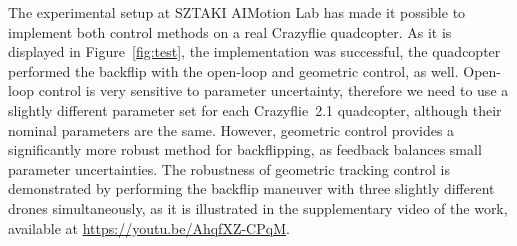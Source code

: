 The experimental setup at SZTAKI AIMotion Lab has made it possible to implement both control methods on a real Crazyflie quadcopter. As it is displayed in Figure~\ref{fig:test}, the implementation was successful, the quadcopter performed the backflip with the open-loop and geometric control, as well. Open-loop control is very sensitive to parameter uncertainty, therefore we need to use a slightly different parameter set for each Crazyflie~2.1 quadcopter, although their nominal parameters are the same. However, geometric control provides a significantly more robust method for backflipping, as feedback balances small parameter uncertainties. The robustness of geometric tracking control is demonstrated by performing the backflip maneuver with three slightly different drones simultaneously, as it is illustrated in the supplementary video of the work, available at \url{https://youtu.be/AhqfXZ-CPqM}.




